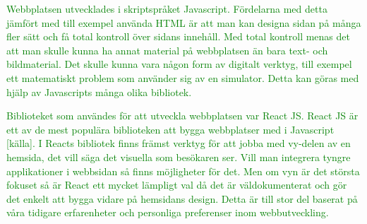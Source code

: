\textcolor{green}{Webbplatsen utvecklades i skriptspråket Javascript. Fördelarna med detta jämfört med till exempel använda HTML är att man kan designa sidan på många fler sätt och få total kontroll över sidans innehåll. Med total kontroll menas det att man skulle kunna ha annat material på webbplatsen än bara text- och bildmaterial. Det skulle kunna vara någon form av digitalt verktyg, till exempel ett matematiskt problem som använder sig av en simulator. Detta kan göras med hjälp av Javascripts många olika bibliotek.}

\textcolor{green}{Biblioteket som användes för att utveckla webbplatsen var React JS. React JS är ett av de mest populära biblioteken att bygga webbplatser med i Javascript [källa]. I Reacts bibliotek finns främst verktyg för att jobba med vy-delen av en hemsida, det vill säga det visuella som besökaren ser. Vill man integrera tyngre applikationer i webbsidan så finns möjligheter för det. Men om vyn är det största fokuset så är React ett mycket lämpligt val då det är väldokumenterat och gör det enkelt att bygga vidare på hemsidans design. Detta är till stor del baserat på våra tidigare erfarenheter och personliga preferenser inom webbutveckling.}